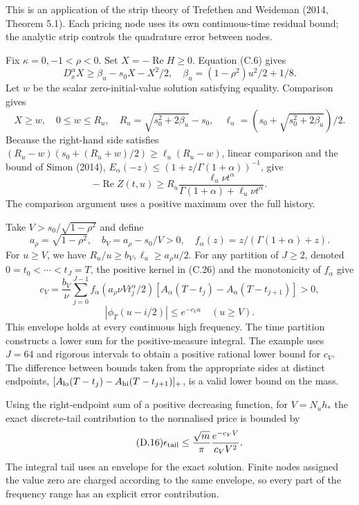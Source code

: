 \documentclass[11pt,a4paper]{article}
\begin{document}
This is an application of the strip theory of Trefethen and Weideman (2014, Theorem 5.1). Each pricing node uses its own continuous-time residual bound; the analytic strip controls the quadrature error between nodes.

Fix \(\kappa=0,-1<\rho<0\). Set \(X=-\operatorname{Re}H\ge0\). Equation (C.6) gives
\begin{equation*}\tag{D.13}
D_x^\alpha X\ge\beta_u-s_0X-X^2/2,\quad
\beta_u=(1-\rho^2)u^2/2+1/8.
\end{equation*}
Let \(w\) be the scalar zero-initial-value solution satisfying equality. Comparison gives
\[
X\ge w,\quad 0\le w\le R_u,\quad
R_u=\sqrt{s_0^2+2\beta_u}-s_0,\quad
\ell_u=(s_0+\sqrt{s_0^2+2\beta_u})/2.
\]
Because the right-hand side satisfies \((R_u-w)(s_0+(R_u+w)/2)\ge\ell_u(R_u-w)\), linear comparison and the bound of Simon (2014),
\(E_\alpha(-z)\le(1+z/\Gamma(1+\alpha))^{-1}\), give
\begin{equation*}\tag{D.14}
-\operatorname{Re}Z(t,u)\ge
R_u\frac{\ell_u\nu t^\alpha}{\Gamma(1+\alpha)+\ell_u\nu t^\alpha}.
\end{equation*}
The comparison argument uses a positive maximum over the full history.

Take \(V>s_0/\sqrt{1-\rho^2}\) and define
\[
a_\rho=\sqrt{1-\rho^2},\quad b_V=a_\rho-s_0/V>0,\quad
f_\alpha(z)=z/(\Gamma(1+\alpha)+z).
\]
For \(u\ge V\), we have \(R_u/u\ge b_V,\ell_u\ge a_\rho u/2\). For any partition of \(J\ge2\), denoted \(0=t_0<\cdots<t_J=T\), the positive kernel in (C.26) and the monotonicity of \(f_\alpha\) give
\[
c_V=\frac{b_V}{\nu}\sum_{j=0}^{J-1}
 f_\alpha(a_\rho\nu Vt_j^\alpha/2)
 [A_\alpha(T-t_j)-A_\alpha(T-t_{j+1})]>0,
\]
\begin{equation*}\tag{D.15}
|\phi_T(u-i/2)|\le e^{-c_Vu}\quad(u\ge V).
\end{equation*}
This envelope holds at every continuous high frequency. The time partition constructs a lower sum for the positive-measure integral. The example uses \(J=64\) and rigorous intervals to obtain a positive rational lower bound for \(c_V\). The difference between bounds taken from the appropriate sides at distinct endpoints,
\([A_{\rm lo}(T-t_j)-A_{\rm hi}(T-t_{j+1})]_+\),
is a valid lower bound on the mass.

Using the right-endpoint sum of a positive decreasing function, for \(V=N_uh_*\) the exact discrete-tail contribution to the normalised price is bounded by
\begin{equation*}\tag{D.16}
\epsilon_{\rm tail}
\le\frac{\sqrt m}{\pi}\frac{e^{-c_VV}}{c_VV^2}.
\end{equation*}
The integral tail uses an envelope for the exact solution. Finite nodes assigned the value zero are charged according to the same envelope, so every part of the frequency range has an explicit error contribution.
\end{document}
